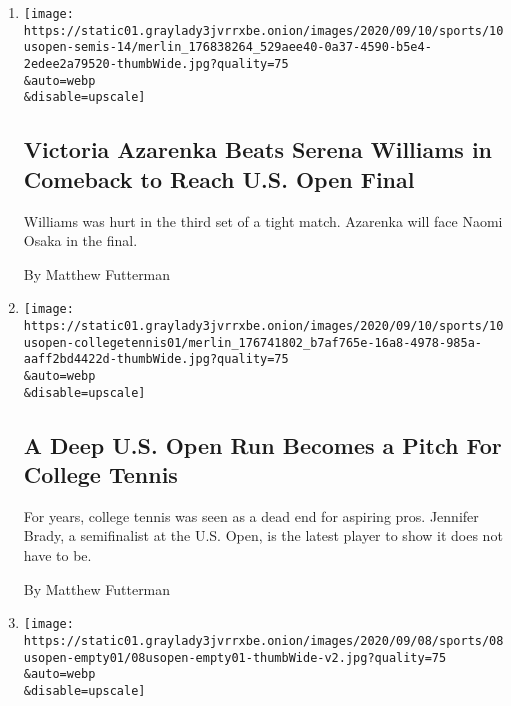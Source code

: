 \begin{enumerate}
\def\labelenumi{\arabic{enumi}.}
\item
  \href{/2020/09/10/sports/tennis/us-open-naomi-osaka-jennifer-brady-serena-williams-victoria-azarenka-semifinal.html}{}

  \texttt{[image: https://static01.graylady3jvrrxbe.onion/images/2020/09/10/sports/10usopen-semis-14/merlin\_176838264\_529aee40-0a37-4590-b5e4-2edee2a79520-thumbWide.jpg?quality=75\\\&auto=webp\\\&disable=upscale]}

  \hypertarget{victoria-azarenka-beats-serena-williams-in-comeback-to-reach-us-open-final}{%
  \subsection{Victoria Azarenka Beats Serena Williams in Comeback to
  Reach U.S. Open
  Final}\label{victoria-azarenka-beats-serena-williams-in-comeback-to-reach-us-open-final}}

  Williams was hurt in the third set of a tight match. Azarenka will
  face Naomi Osaka in the final.

  By Matthew Futterman
\item
  \href{/2020/09/10/sports/tennis/jennifer-brady-us-open.html}{}

  \texttt{[image: https://static01.graylady3jvrrxbe.onion/images/2020/09/10/sports/10usopen-collegetennis01/merlin\_176741802\_b7af765e-16a8-4978-985a-aaff2bd4422d-thumbWide.jpg?quality=75\\\&auto=webp\\\&disable=upscale]}

  \hypertarget{a-deep-us-open-run-becomes-a-pitch-for-college-tennis}{%
  \subsection{A Deep U.S. Open Run Becomes a Pitch For College
  Tennis}\label{a-deep-us-open-run-becomes-a-pitch-for-college-tennis}}

  For years, college tennis was seen as a dead end for aspiring pros.
  Jennifer Brady, a semifinalist at the U.S. Open, is the latest player
  to show it does not have to be.

  By Matthew Futterman
\item
  \href{/2020/09/09/sports/us-open-crowd.html}{}

  \texttt{[image: https://static01.graylady3jvrrxbe.onion/images/2020/09/08/sports/08usopen-empty01/08usopen-empty01-thumbWide-v2.jpg?quality=75\\\&auto=webp\\\&disable=upscale]}

  \hypertarget{at-the-us-open-silence-is-a-sweet-sound-for-the-underdogs}{%
}
\end{enumerate}
